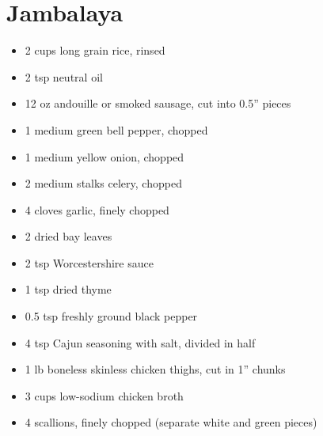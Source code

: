 \section{Jambalaya}

\begin{itemize}
\item 2 cups long grain rice, rinsed
\item 2 tsp neutral oil
\item 12 oz andouille or smoked sausage, cut into 0.5” pieces
\item 1 medium green bell pepper, chopped
\item 1 medium yellow onion, chopped
\item 2 medium stalks celery, chopped
\item 4 cloves garlic, finely chopped
\item 2 dried bay leaves
\item 2 tsp Worcestershire sauce
\item 1 tsp dried thyme
\item 0.5 tsp freshly ground black pepper
\item 4 tsp Cajun seasoning with salt, divided in half
\item 1 lb boneless skinless chicken thighs, cut in 1” chunks
\item 3 cups low-sodium chicken broth
\item 4 scallions, finely chopped (separate white and green pieces)
\end{itemize}


